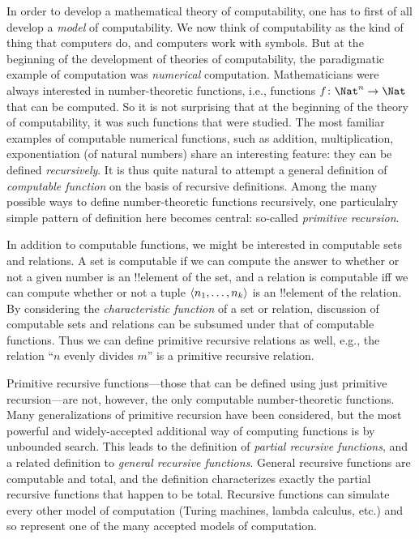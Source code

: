 \documentclass[../../../include/open-logic-section]{subfiles}
\begin{document}

In order to develop a mathematical theory of computability, one has to
first of all develop a \emph{model} of computability.  We now think of
computability as the kind of thing that computers do, and computers
work with symbols.  But at the beginning of the development of
theories of computability, the paradigmatic example of computation was
\emph{numerical} computation.  Mathematicians were always interested
in number-theoretic functions, i.e., functions $f\colon \Nat^n \to
\Nat$ that can be computed. So it is not surprising that at the
beginning of the theory of computability, it was such functions that
were studied.  The most familiar examples of computable numerical
functions, such as addition, multiplication, exponentiation (of
natural numbers) share an interesting feature: they can be defined
\emph{recursively}.  It is thus quite natural to attempt a general
definition of \emph{computable function} on the basis of recursive
definitions.  Among the many possible ways to define number-theoretic
functions recursively, one particulalry simple pattern of definition
here becomes central: so-called \emph{primitive recursion}.

In addition to computable functions, we might be interested in
computable sets and relations. A set is computable if we can compute
the answer to whether or not a given number is an !!{element} of the
set, and a relation is computable iff we can compute whether or not a
tuple $\langle n_1, \dots, n_k \rangle$ is an !!{element} of the relation.  By
considering the \emph{characteristic function} of a set or relation,
discussion of computable sets and relations can be subsumed under that
of computable functions.  Thus we can define primitive recursive
relations as well, e.g., the relation ``$n$ evenly divides $m$'' is a
primitive recursive relation.

Primitive recursive functions---those that can be defined using just
primitive recursion---are not, however, the only computable
number-theoretic functions. Many generalizations of primitive
recursion have been considered, but the most powerful and
widely-accepted additional way of computing functions is by unbounded
search.  This leads to the definition of \emph{partial recursive
  functions}, and a related definition to \emph{general recursive
  functions}.  General recursive functions are computable and total,
and the definition characterizes exactly the partial recursive
functions that happen to be total.  Recursive functions can simulate
every other model of computation (Turing machines, lambda calculus,
etc.) and so represent one of the many accepted models of computation.
\end{document}
